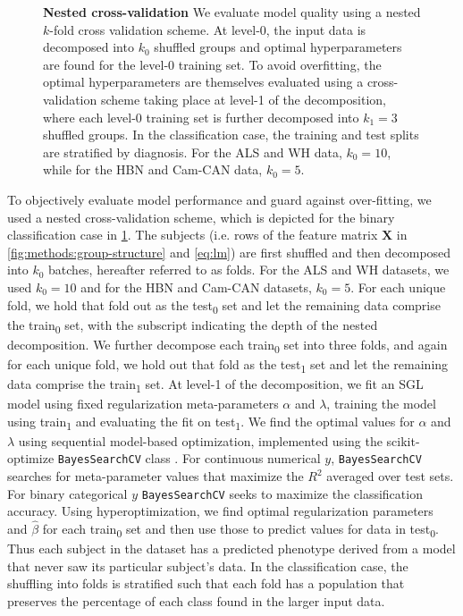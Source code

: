 \documentclass[10pt,letterpaper]{article}
\begin{document}
\begin{figure}[t]
    \caption{{\bf Nested cross-validation}
        \label{fig:nested-cross-val}
        We evaluate model quality using a nested $k$-fold cross validation
        scheme. At level-0, the input data is decomposed into $k_0$ shuffled
        groups and optimal hyperparameters are found for the level-0 training
        set. To avoid overfitting, the optimal hyperparameters are themselves
        evaluated using a cross-validation scheme taking place at level-1 of
        the decomposition, where each level-0 training set is further
        decomposed into $k_1 = 3$ shuffled groups. In the classification
        case, the training and test splits are stratified by diagnosis. For
        the ALS and WH data, $k_0 = 10$, while for the HBN and Cam-CAN data,
        $k_0 = 5$.
    }
\end{figure}

To objectively evaluate model performance and guard against over-fitting,
we used a nested cross-validation scheme, which is depicted for the binary
classification case in \cref{fig:nested-cross-val}. The subjects (i.e. rows
of the feature matrix $\mathbf{X}$ in \cref{fig:methods:group-structure}
and \cref{eq:lm}) are first shuffled and then decomposed into $k_0$ batches,
hereafter referred to as folds. For the ALS and WH datasets, we used $k_0 =
10$ and for the HBN and Cam-CAN datasets, $k_0 = 5$. For each unique fold, we
hold that fold out as the test\textsubscript{0} set and let the remaining
data comprise the train\textsubscript{0} set, with the subscript indicating
the depth of the nested decomposition. We further decompose each
train\textsubscript{0} set into three folds, and again for each unique fold,
we hold out that fold as the test\textsubscript{1} set and let the remaining
data comprise the train\textsubscript{1} set. At level-1 of the
decomposition, we fit an SGL model using fixed regularization meta-parameters
$\alpha$ and $\lambda$, training the model using train\textsubscript{1} and
evaluating the fit on test\textsubscript{1}. We find the optimal values for
$\alpha$ and $\lambda$ using sequential model-based optimization, implemented
using the scikit-optimize \lstinline|BayesSearchCV| class \cite{scikit_optimize}.
For continuous numerical $y$, \lstinline|BayesSearchCV| searches for
meta-parameter values that maximize the $R^2$ averaged over test sets. For
binary categorical $y$ \lstinline|BayesSearchCV| seeks to maximize the
classification accuracy. Using hyperoptimization, we find optimal
regularization parameters and $\hat{\beta}$ for each train\textsubscript{0}
set and then use those to predict values for data in test\textsubscript{0}.
Thus each subject in the dataset has a predicted phenotype derived from a
model that never saw its particular subject's data. In the classification
case, the shuffling into folds is stratified such that each fold has a
population that preserves the percentage of each class found in the larger
input data.
\end{document}
